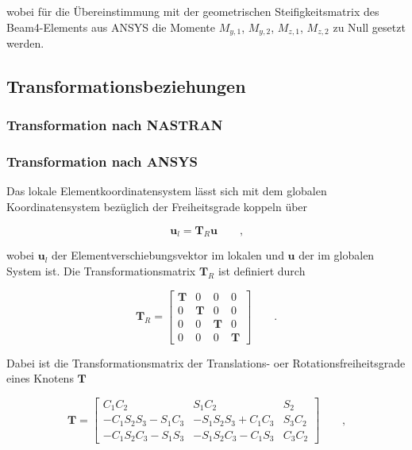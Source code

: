 \documentclass[11pt,titlepage,listof=totoc,bibliography=totoc,twoside]{scrreprt}
\begin{document}
wobei für die Übereinstimmung mit der geometrischen Steifigkeitsmatrix des Beam4-Elements aus ANSYS die Momente $M_{y,1}$, $M_{y,2}$, $M_{z,1}$, $M_{z,2}$ zu Null gesetzt werden.

\subsection{Transformationsbeziehungen}

\subsubsection{Transformation nach NASTRAN}

\subsubsection{Transformation nach ANSYS}

Das lokale Elementkoordinatensystem lässt sich mit dem globalen Koordinatensystem bezüglich der Freiheitsgrade koppeln über

\begin{equation}
\mathbf{u}_l=\mathbf{T}_R\mathbf{u}	\qquad\mbox{,}
\end{equation}

wobei $\mathbf{u}_l$ der Elementverschiebungsvektor im lokalen und $\mathbf{u}$ der im globalen System ist. Die Transformationsmatrix $\mathbf{T}_R$ ist definiert durch

\begin{equation}
\mathbf{T}_R=\begin{bmatrix}\mathbf{T} & 0 & 0 & 0\\0 & \mathbf{T} & 0 & 0\\0 & 0 & \mathbf{T} & 0\\0 & 0 & 0 & \mathbf{T}\end{bmatrix}	\qquad\mbox{.}
\end{equation}

Dabei ist die Transformationsmatrix der Translations- oer Rotationsfreiheitsgrade eines Knotens $\mathbf{T}$

\begin{equation}
\mathbf{T}=\begin{bmatrix}C_1C_2	&	S_1C_2	&	S_2	\\ -C_1S_2S_3-S_1C_3	&	-S_1S_2S_3+C_1C_3	&	S_3C_2	\\	-C_1S_2C_3-S_1S_3	&	-S_1S_2C_3-C_1S_3	&	C_3C_2\end{bmatrix}	\qquad\mbox{,}
\end{equation}
\end{document}
